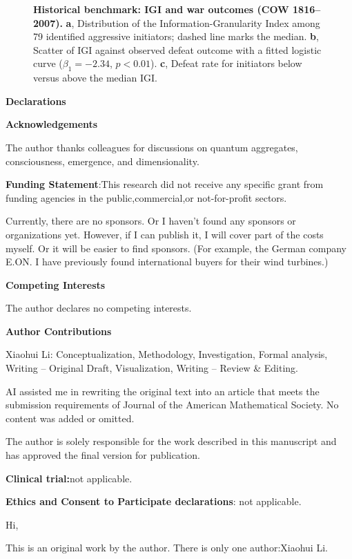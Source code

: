 \documentclass[11pt,a4paper]{article}
\begin{document}
\begin{figure}[p]
\begin{tikzpicture}
\end{tikzpicture}
\caption{\textbf{Historical benchmark: IGI and war outcomes (COW 1816--2007).} \textbf{a}, Distribution of the Information-Granularity Index among 79 identified aggressive initiators; dashed line marks the median. \textbf{b}, Scatter of IGI against observed defeat outcome with a fitted logistic curve ($\beta_1=-2.34$, $p<0.01$). \textbf{c}, Defeat rate for initiators below versus above the median IGI.}
\label{fig:history}
\end{figure}
\textbf{\textbf{Declarations}}

  
  
  \textbf{\textbf{Acknowledgements}}

The author thanks colleagues for discussions on quantum aggregates, consciousness, emergence, and dimensionality. 

 \textbf{\textbf{Funding Statement}}:This research did not receive any specific grant from funding agencies in the public,commercial,or not-for-profit sectors.

Currently, there are no sponsors. Or I haven't found any sponsors or organizations yet. However, if I can publish it, I will cover part of the costs myself. Or it will be easier to find sponsors. (For example, the German company E.ON. I have previously found international buyers for their wind turbines.)

 \textbf{\textbf{Competing Interests}}

The author declares no competing interests.

 \textbf{\textbf{Author Contributions}}

Xiaohui Li: Conceptualization, Methodology, Investigation, Formal analysis, Writing – Original Draft, Visualization, Writing – Review \& Editing.

AI assisted me in rewriting the original text into an article that meets the submission requirements of Journal of the American Mathematical Society. No content was added or omitted.

 The author is solely responsible for the work described in this manuscript and has approved the final version for publication.

 \textbf{\textbf{Clinical trial:}}not applicable.

 \textbf{\textbf{Ethics and Consent to Participate declarations}}: not applicable.

 Hi,

This is an original work by the author. There is only one author:Xiaohui Li.
\end{document}
